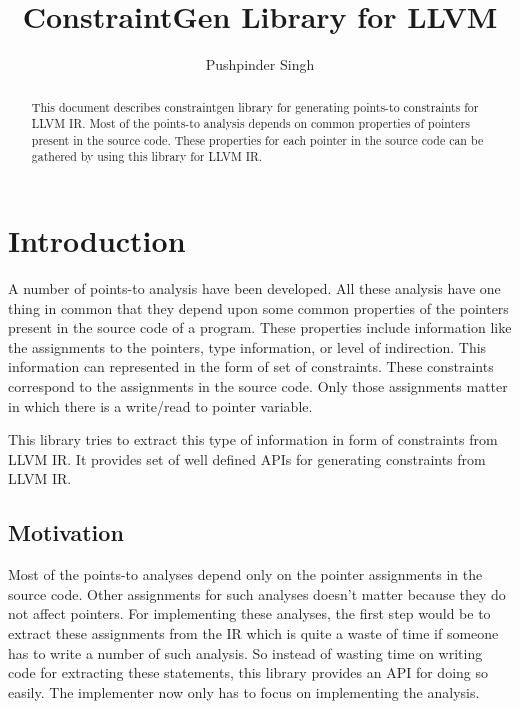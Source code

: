 \documentclass[a4paper,11pt]{report}
\title{ConstraintGen Library for LLVM}
\author{Pushpinder Singh}
\begin{document}
\maketitle

\begin{abstract}

This document describes constraintgen library for generating points-to 
constraints for LLVM IR. Most of the points-to analysis depends on common 
properties of pointers present in the source code. These properties for each 
pointer in the source code can be gathered by using this library for LLVM IR.

\end{abstract}

\tableofcontents

\chapter{Introduction}

A number of points-to analysis have been developed. All these analysis have one 
thing in common that they depend upon some common properties of the pointers 
present in the source code of a program. These properties include information 
like the assignments to the pointers, type information, or level of indirection.
This information can represented in the form of set of constraints. These 
constraints correspond to the assignments in the source code. Only those 
assignments matter in which there is a write/read to pointer variable.

This library tries to extract this type of information in form of constraints 
from LLVM IR. It provides set of well defined APIs for generating constraints 
from LLVM IR.

\section{Motivation}
Most of the points-to analyses depend only on the pointer assignments in
the source code. Other assignments for such analyses doesn't matter because
they do not affect pointers. For implementing these analyses, the
first step would be to extract these assignments from the IR which is quite a 
waste of time if someone has to write a number of such analysis. So instead of
wasting time on writing code for extracting these statements, this library 
provides an API for doing so easily. The implementer now only has to focus on 
implementing the analysis.
\end{document}
